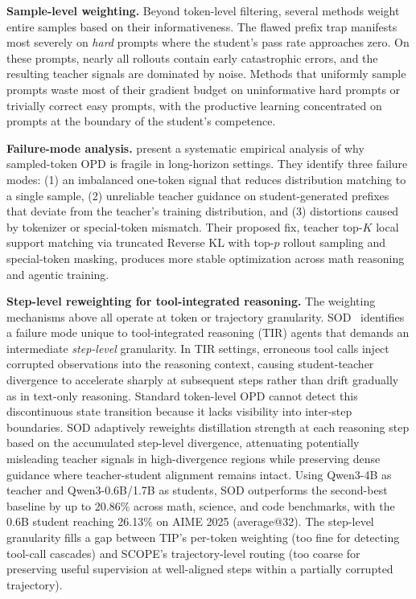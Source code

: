 \documentclass{article} %
\begin{document}
\textbf{Sample-level weighting.} Beyond token-level filtering, several methods weight entire samples based on their informativeness. The flawed prefix trap manifests most severely on \emph{hard} prompts where the student's pass rate approaches zero. On these prompts, nearly all rollouts contain early catastrophic errors, and the resulting teacher signals are dominated by noise. Methods that uniformly sample prompts waste most of their gradient budget on uninformative hard prompts or trivially correct easy prompts, with the productive learning concentrated on prompts at the boundary of the student's competence.

\textbf{Failure-mode analysis.} \citet{2603.25562} present a systematic empirical analysis of why sampled-token OPD is fragile in long-horizon settings. They identify three failure modes: (1) an imbalanced one-token signal that reduces distribution matching to a single sample, (2) unreliable teacher guidance on student-generated prefixes that deviate from the teacher's training distribution, and (3) distortions caused by tokenizer or special-token mismatch. Their proposed fix, teacher top-$K$ local support matching via truncated Reverse KL with top-$p$ rollout sampling and special-token masking, produces more stable optimization across math reasoning and agentic training.

\textbf{Step-level reweighting for tool-integrated reasoning.} The weighting mechanisms above all operate at token or trajectory granularity. SOD~\citep{zhong2026sod} identifies a failure mode unique to tool-integrated reasoning (TIR) agents that demands an intermediate \emph{step-level} granularity. In TIR settings, erroneous tool calls inject corrupted observations into the reasoning context, causing student-teacher divergence to accelerate sharply at subsequent steps rather than drift gradually as in text-only reasoning. Standard token-level OPD cannot detect this discontinuous state transition because it lacks visibility into inter-step boundaries. SOD adaptively reweights distillation strength at each reasoning step based on the accumulated step-level divergence, attenuating potentially misleading teacher signals in high-divergence regions while preserving dense guidance where teacher-student alignment remains intact. Using Qwen3-4B as teacher and Qwen3-0.6B/1.7B as students, SOD outperforms the second-best baseline by up to 20.86\% across math, science, and code benchmarks, with the 0.6B student reaching 26.13\% on AIME 2025 (average@32). The step-level granularity fills a gap between TIP's per-token weighting (too fine for detecting tool-call cascades) and SCOPE's trajectory-level routing (too coarse for preserving useful supervision at well-aligned steps within a partially corrupted trajectory).
\end{document}
